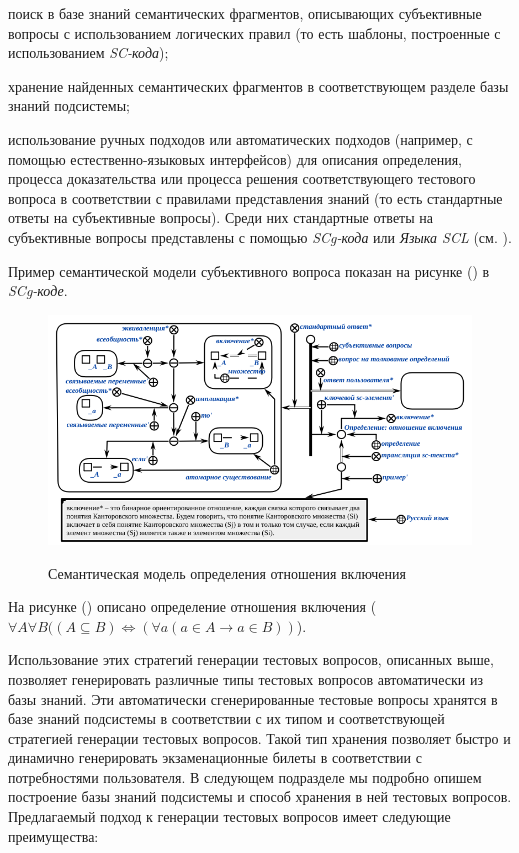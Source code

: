 \begin{textitemize}
	\item поиск в базе знаний семантических фрагментов, описывающих субъективные вопросы с использованием логических правил (то есть шаблоны, построенные с использованием \textit{SC-кода});
	\item хранение найденных семантических фрагментов в соответствующем разделе базы знаний подсистемы;
	\item использование ручных подходов или автоматических подходов (например, с помощью естественно-языковых интерфейсов) для описания определения, процесса доказательства или процесса решения соответствующего тестового вопроса в соответствии с правилами представления знаний (то есть стандартные ответы на субъективные вопросы). Среди них стандартные ответы на субъективные вопросы представлены с помощью \textit{SCg-кода} или \textit{Языка SCL} (см. ).
	
\end{textitemize}

Пример семантической модели субъективного вопроса показан на рисунке (\textit{}) в \textit{SCg-коде}.

\begin{figure}[H]
	\caption{Семантическая модель определения отношения включения}
	\includegraphics[scale=0.8]{author/part7/figures/DI_question_example.png}
	\label{fig:DI_example}
\end{figure}

На рисунке (\textit{}) описано определение отношения включения ($\forall A\forall B((A\subseteq B)\Longleftrightarrow (\forall a(a\in A\rightarrow a\in B))$).

Использование этих стратегий генерации тестовых вопросов, описанных выше, позволяет генерировать различные типы тестовых вопросов автоматически из базы знаний. Эти автоматически сгенерированные тестовые вопросы хранятся в базе знаний подсистемы в соответствии с их типом и соответствующей стратегией генерации тестовых вопросов. Такой тип хранения позволяет быстро и динамично генерировать экзаменационные билеты в соответствии с потребностями пользователя. В следующем подразделе мы подробно опишем построение базы знаний подсистемы и способ хранения в ней тестовых вопросов. Предлагаемый подход к генерации тестовых вопросов имеет следующие преимущества:

